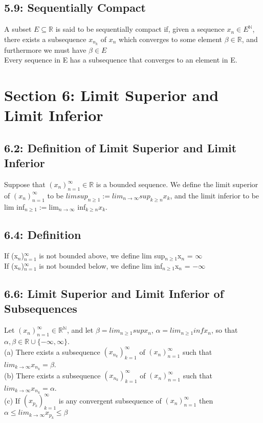 \documentclass[10pt,letter]{report}
\begin{document}
\section*{5.9: Sequentially Compact}
A subset $E \subseteq \mathbb{R}$ is said to be sequentially compact if, given a sequence $x_n \in E^\mathbb{N}$, there exists a subsequence $x_{n_k}$ of $x_n$ which converges to some element $\beta \in \mathbb{R}$, and furthermore we must have $\beta \in E$\\ 
Every sequence in E has a subsequence that converges to an element in E. 



\chapter*{Section 6: Limit Superior and Limit Inferior}

\section*{6.2: Definition of Limit Superior and Limit Inferior}
Suppose that $(x_n)_{n=1}^\infty \in \mathbb{R}$ is a bounded sequence. We define the limit superior of $(x_n)_{n=1}^\infty$ to be $lim sup_{n\geq 1} := lim_{n\rightarrow\infty} sup_{k\geq n} x_k$, and the limit inferior to be lim inf$_{n\geq 1} := $lim$_{n\rightarrow\infty}$ inf$_{k\geq n} x_k$.

\section*{6.4: Definition}
If (x$_n$)$_{n=1}^\infty$ is not bounded above, we define lim sup$_{n\geq 1}$x$_n$ = $\infty$\\
If (x$_n$)$_{n=1}^\infty$ is not bounded below, we define lim inf$_{n\geq 1}$x$_n$ = $-\infty$

\section*{6.6: Limit Superior and Limit Inferior of Subsequences}
Let $(x_n)_{n=1}^\infty\in\mathbb{R}^\mathbb{N}$, and let $\beta = lim_{n\geq 1}sup x_n$, $\alpha = lim_{n\geq 1}inf x_n$, so that $\alpha, \beta \in \mathbb{R}\cup \{-\infty, \infty\}$. \\ 
(a) There exists a subsequence $(x_{n_k})_{k=1}^\infty$ of $(x_n)_{n=1}^\infty$ such that $lim_{k\rightarrow\infty}x_{n_k} = \beta$. \\ 
(b) There exists a subsequence $(x_{n_k})_{k=1}^\infty$ of $(x_n)_{n=1}^\infty$ such that $lim_{k\rightarrow\infty}x_{n_k} = \alpha$. \\ 
(c) If $(x_{p_k})_{k=1}^\infty$ is any convergent subsequence of $(x_n)_{n=1}^\infty$ then $\alpha\leq lim_{k\rightarrow\infty}x_{p_k}\leq\beta$
\end{document}

